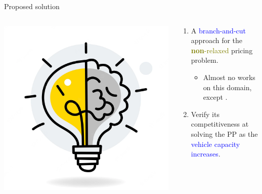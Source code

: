 \begin{frame}{Proposed solution}
	\begin{columns}
		\begin{column}{0.3\textwidth}
			\centering
			\includegraphics[width=\textwidth]{./Imgs/idea.png}
		\end{column}
		\begin{column}{0.7\textwidth}
			\begin{enumerate}
				\item A \textcolor{blue}{branch-and-cut} approach for the \textcolor{olive}{\textbf{non}-relaxed} pricing problem.
				      \begin{itemize}
					      \item Almost no works on this domain, except \parencite{jepsen2014}.
				      \end{itemize}
				\item Verify its competitiveness at solving the PP as the \textcolor{blue}{vehicle capacity increases}.
			\end{enumerate}
		\end{column}
	\end{columns}
\end{frame}

